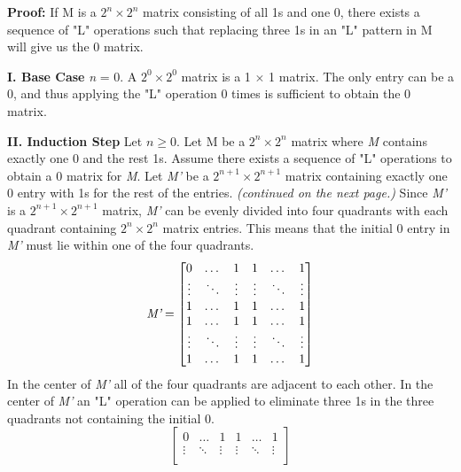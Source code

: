 \documentclass[11pt]{article}
\begin{document}
\begin{flushleft}
		\textbf{Proof:}\newline
		If M is a $2^n \times 2^n$ matrix consisting of all 1s and one 0, there exists a sequence of "L" operations such that replacing three 1s in an "L" pattern in M will give us the 0 matrix. \newline
		
		\textbf{I. Base Case}\newline
		\emph{n} = 0. A $2^0 \times 2^0$ matrix is a 1 $\times$ 1 matrix. The only entry can be a 0, and thus applying the "L" operation 0 times is sufficient to obtain the 0 matrix.\newline 
		
		\textbf{II. Induction Step}\newline
		Let $n \ge 0$. Let M be a $2^n \times 2^n$ matrix where \emph{M} contains exactly one 0 and the rest 1s. Assume there exists a sequence of "L" operations to obtain a 0 matrix for \emph{M}. Let \emph{M'} be a $2^{n + 1} \times 2^{n + 1}$ matrix containing exactly one 0 entry with 1s for the rest of the entries.\newline 
		\emph{(continued on the next page.)}
		\newpage
		Since \emph{M'} is a $2^{n + 1} \times 2^{n + 1}$ matrix, \emph{M'} can be evenly divided into four quadrants with each quadrant containing $2^n \times 2^n$ matrix entries. This means that the initial 0 entry in \emph{M'} must lie within one of the four quadrants.
		\[
		\emph{M'} = 
		\begin{bmatrix}
			0      & \dots  & 1      & 1      & \dots  & 1      \\
			\vdots & \ddots & \vdots & \vdots & \ddots & \vdots \\
			1      & \dots  & 1      & 1      & \dots  & 1      \\     
			1      & \dots  & 1      & 1      & \dots  & 1      \\
			\vdots & \ddots & \vdots & \vdots & \ddots & \vdots \\
			1      & \dots  & 1      & 1      & \dots  & 1      \\   
		\end{bmatrix}
		\]
		In the center of \emph{M'} all of the four quadrants are adjacent to each other. In the center of \emph{M'} an "L" operation can be applied to eliminate three 1s in the three quadrants not containing the initial 0.
		\[
		\begin{bmatrix}
			0      & \dots  & 1      & 1      & \dots  & 1      \\
			\vdots & \ddots & \vdots & \vdots & \ddots & \vdots \\

\end{bmatrix}\]
\end{flushleft}
\end{document}
